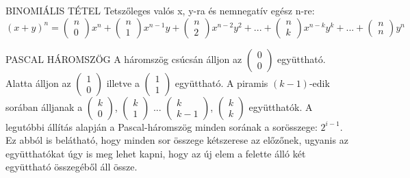 \begin{tetel}{BINOMIÁLIS TÉTEL}
Tetszőleges valós x, y-ra és nemnegatív egész n-re:$$
(x+y)^n = \begin{pmatrix}
n\\0
\end{pmatrix} x^n + \begin{pmatrix}
n\\1
\end{pmatrix} x^{n-1}y + \begin{pmatrix}
n\\2
\end{pmatrix} x^{n-2}y^2 + ... + \begin{pmatrix}
n\\k
\end{pmatrix} x^{n-k}y^k + ... + \begin{pmatrix}
n\\n
\end{pmatrix} y^n$$
\end{tetel}

\begin{definicio}{PASCAL HÁROMSZÖG}
A háromszög csúcsán álljon az  $\begin{pmatrix}
0\\0
\end{pmatrix}$ együttható. Alatta álljon az $\begin{pmatrix}
1\\0
\end{pmatrix}$ illetve a $\begin{pmatrix}
1\\1
\end{pmatrix}$ együttható. A piramis $(k-1)$-edik sorában álljanak a $\begin{pmatrix}
k\\0
\end{pmatrix}$, $\begin{pmatrix}
k\\1
\end{pmatrix}$ ... $\begin{pmatrix}
k\\k-1
\end{pmatrix}$, $\begin{pmatrix}
k\\k
\end{pmatrix}$ együtthatók. A legutóbbi állítás alapján a Pascal-háromszög minden sorának a sorösszege:
$2^{i-1}$. Ez abból is belátható, hogy minden sor összege kétszerese az előzőnek, ugyanis az együtthatókat úgy is meg lehet kapni, hogy az új elem a felette álló két együttható összegéből áll össze.
\end{definicio}

